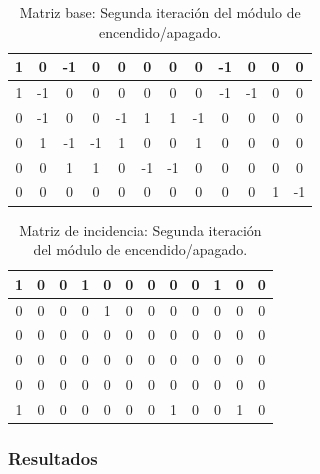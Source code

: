 \begin{table}[H]
    \centering
    \begin{tabular}{|c|c|c|c|c|c|c|c|c|c|c|c|}
        \hline
        1 &  0 & -1 &  0 & \cellcolor{lightgray}0 & 0 & 0 & 0 & -1 & 0 & 0 & 0 \\
        \hline
        1 & -1 &  0 &  0 & \cellcolor{lightgray}0 & 0 & 0 & 0 & -1 & -1 & 0 & 0 \\
        \hline
        0 & -1 &  0 &  0 & \cellcolor{lightgray}-1 & 1 & 1 & -1 & 0 & 0 & 0 & 0 \\
        \hline
        0 &  1 & -1 & -1 & \cellcolor{lightgray}1 & 0 & 0 & 1 & 0 & 0 & 0 & 0 \\
        \hline
        0 &  0 &  1 &  1 & \cellcolor{lightgray}0 & -1 & -1 & 0 & 0 & 0 & 0 & 0 \\
        \hline
        0 &  0 &  0 &  0 & \cellcolor{lightgray}0 & 0 & 0 & 0 & 0 & 0 & 1 & -1 \\
        \hline
    \end{tabular}
    \caption{Matriz base: Segunda iteración del módulo de encendido/apagado.}
    \label{tabla:matriz_base_post_2}
\end{table}

\begin{table}[H]
    \centering
    \begin{tabular}{|c|c|c|c|c|c|c|c|c|c|c|c|}
        \hline
        1 & 0 & 0 & 1 & \cellcolor{lightgray}0 & 0 & 0 & 0 & 0 & 1 & 0 & 0 \\
        \hline
        0 & 0 & 0 & 0 & \cellcolor{lightgray}1 & 0 & 0 & 0 & 0 & 0 & 0 & 0 \\
        \hline
        0 & 0 & 0 & 0 & \cellcolor{lightgray}0 & 0 & 0 & 0 & 0 & 0 & 0 & 0 \\
        \hline
        0 & 0 & 0 & 0 & \cellcolor{lightgray}0 & 0 & 0 & 0 & 0 & 0 & 0 & 0 \\
        \hline
        0 & 0 & 0 & 0 & \cellcolor{lightgray}0 & 0 & 0 & 0 & 0 & 0 & 0 & 0 \\
        \hline
        1 & 0 & 0 & 0 & \cellcolor{lightgray}0 & 0 & 0 & 1 & 0 & 0 & 1 & 0 \\
        \hline
    \end{tabular}
    \caption{Matriz de incidencia: Segunda iteración del módulo de encendido/apagado.}
    \label{tabla:matriz_incidencia_post_2}
\end{table}

\subsubsection{Resultados}

